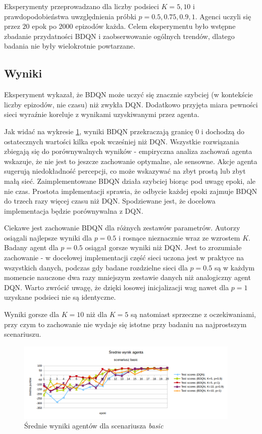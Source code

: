 Eksperymenty przeprowadzano dla liczby podsieci $K=5,10$ i prawdopodobieństwa uwzględnienia próbki $p=0.5,0.75,0.9,1$. Agenci uczyli się przez $20$ epok po $2000$ epizodów każda. Celem eksperymentu było wstępne zbadanie przydatności BDQN i zaobserwowanie ogólnych trendów, dlatego badania nie były wielokrotnie powtarzane.

\subsection{Wyniki}
Eksperyment wykazał, że BDQN może uczyć się znacznie szybciej (w kontekście liczby epizodów, nie czasu) niż zwykła DQN. Dodatkowo przyjęta miara pewności sieci wyraźnie koreluje z wynikami uzyskiwanymi przez agenta.

Jak widać na wykresie \ref{fig:naive_bdqn_test_scores}, wyniki BDQN przekraczają granicę 0 i dochodzą do ostatecznych wartości kilka epok wcześniej niż DQN. Wszystkie rozwiązania zbiegają się do porównywalnych wyników - empiryczna analiza zachowań agenta wskazuje, że nie jest to jeszcze zachowanie optymalne, ale sensowne. Akcje agenta sugerują niedokładność percepcji, co może wskazywać na zbyt prostą lub zbyt małą sieć.
Zaimplementowane BDQN działa szybciej biorąc pod uwagę epoki, ale nie czas. Prostota implementacji sprawia, że odbycie każdej epoki zajmuje BDQN do trzech razy więcej czasu niż DQN. Spodziewane jest, że docelowa implementacja będzie porównywalna z DQN.

Ciekawe jest zachowanie BDQN dla różnych zestawów parametrów. Autorzy \cite{DBLP:journals/corr/OsbandBPR16} osiągali najlepsze wyniki dla $p=0.5$ i rosnące nieznacznie wraz ze wzrostem $K$. Badany agent dla $p=0.5$ osiągał gorsze wyniki niż DQN. Jest to zrozumiałe zachowanie - w docelowej implementacji część sieci uczona jest w praktyce na wszystkich danych, podczas gdy badane rozdzielne sieci dla $p=0.5$ są w każdym momencie nauczone dwa razy mniejszym zestawie danych niż analogiczny agent DQN. Warto zwrócić uwagę, że dzięki losowej inicjalizacji wag nawet dla $p=1$ uzyskane podsieci nie są identyczne.

Wyniki gorsze dla $K=10$ niż dla $K=5$ są natomiast sprzeczne z oczekiwaniami, przy czym to zachowanie nie wydaje się istotne przy badaniu na najprostszym scenariuszu.

\begin{figure}[H]
    \centering
    \includegraphics[width=0.95\textwidth]{figures/figures/naive_bdqn_test_scores.png}
    \caption{Średnie wyniki agentów dla scenariusza \textit{basic}}
    \label{fig:naive_bdqn_test_scores}
\end{figure}

